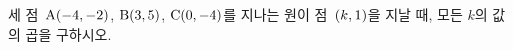 세 점~$\mathrm{A}(-4{,}\mkern3mu\mathopen{}-2)$, $\mathrm{B}(3{,}\mkern3mu\mathopen{}5)$, $\mathrm{C}(0{,}\mkern3mu\mathopen{}-4)$를 지나는 원이 점~$(k{,}\mkern3mu\mathopen{}1)$을 지날 때, 모든 $k$의 값의 곱을 구하시오.
